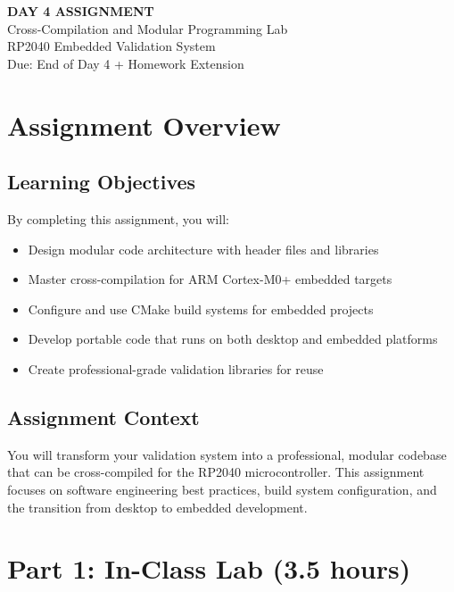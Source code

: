 \documentclass[11pt,a4paper]{article}
\begin{document}
\begin{center}
    {\Huge\bfseries\color{codeblue} DAY 4 ASSIGNMENT}\\[0.5cm]
    {\Large Cross-Compilation and Modular Programming Lab}\\[0.3cm]
    {\large RP2040 Embedded Validation System}\\[0.2cm]
    {\normalsize Due: End of Day 4 + Homework Extension}
\end{center}

\vspace{1cm}

\section{Assignment Overview}

\subsection{Learning Objectives}
By completing this assignment, you will:
\begin{itemize}
    \item Design modular code architecture with header files and libraries
    \item Master cross-compilation for ARM Cortex-M0+ embedded targets
    \item Configure and use CMake build systems for embedded projects
    \item Develop portable code that runs on both desktop and embedded platforms
    \item Create professional-grade validation libraries for reuse
\end{itemize}

\subsection{Assignment Context}
You will transform your validation system into a professional, modular codebase that can be cross-compiled for the RP2040 microcontroller. This assignment focuses on software engineering best practices, build system configuration, and the transition from desktop to embedded development.

\section{Part 1: In-Class Lab (3.5 hours)}
\end{document}
